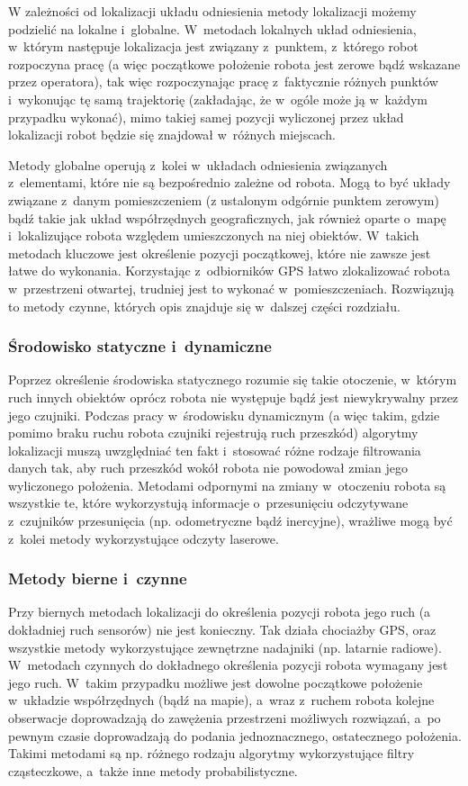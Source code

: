W zależności od lokalizacji układu odniesienia metody lokalizacji możemy
podzielić na lokalne i~globalne. W~metodach lokalnych układ odniesienia, 
w~którym następuje lokalizacja jest związany z~punktem, z~którego robot rozpoczyna
pracę (a więc początkowe położenie robota jest zerowe bądź wskazane przez
operatora), tak więc rozpoczynając pracę z~faktycznie różnych punktów 
i~wykonując tę samą trajektorię (zakładając, że w~ogóle może ją w~każdym
przypadku wykonać), mimo takiej samej pozycji wyliczonej przez układ
lokalizacji robot będzie się znajdował w~różnych miejscach.

Metody globalne operują z~kolei w~układach odniesienia związanych z~elementami,
które nie są bezpośrednio zależne od robota. Mogą to być układy związane z~danym
pomieszczeniem (z ustalonym odgórnie punktem zerowym) bądź takie jak układ
współrzędnych geograficznych, jak również oparte o~mapę i~lokalizujące robota
względem umieszczonych na niej obiektów. W~takich metodach kluczowe jest
określenie pozycji początkowej, które nie zawsze jest łatwe do wykonania.
Korzystając z~odbiorników GPS łatwo zlokalizować robota w~przestrzeni otwartej,
trudniej jest to wykonać w~pomieszczeniach. Rozwiązują to metody czynne, których
opis znajduje się w~dalszej części rozdziału.

\subsubsection{Środowisko statyczne i~dynamiczne}

Poprzez określenie środowiska statycznego rozumie się takie otoczenie, w~którym
ruch innych obiektów oprócz robota nie występuje bądź jest niewykrywalny przez
jego czujniki. Podczas pracy w~środowisku dynamicznym (a więc takim, gdzie
pomimo braku ruchu robota czujniki rejestrują ruch przeszkód) algorytmy
lokalizacji muszą uwzględniać ten fakt i~stosować różne rodzaje filtrowania
danych tak, aby ruch przeszkód wokół robota nie powodował zmian jego wyliczonego
położenia. Metodami odpornymi na zmiany w~otoczeniu robota są wszystkie te,
które wykorzystują informacje o~przesunięciu odczytywane z~czujników
przesunięcia (np. odometryczne bądź inercyjne), wrażliwe mogą być z~kolei metody
wykorzystujące odczyty laserowe.

\subsubsection{Metody bierne i~czynne}

Przy biernych metodach lokalizacji do określenia pozycji robota jego ruch
(a dokładniej ruch sensorów) nie jest konieczny. Tak działa chociażby GPS, oraz
wszystkie metody wykorzystujące zewnętrzne nadajniki (np. latarnie radiowe). 
W~metodach czynnych do dokładnego określenia pozycji robota wymagany jest jego
ruch. W~takim przypadku możliwe jest dowolne początkowe położenie w~układzie
współrzędnych (bądź na mapie), a~wraz z~ruchem robota kolejne obserwacje
doprowadzają do zawężenia przestrzeni możliwych rozwiązań, a~po pewnym czasie
doprowadzają do podania jednoznacznego, ostatecznego położenia. Takimi metodami są np.
różnego rodzaju algorytmy wykorzystujące filtry cząsteczkowe, a~także inne 
metody probabilistyczne.

